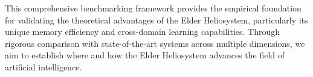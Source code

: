 This comprehensive benchmarking framework provides the empirical foundation for validating the theoretical advantages of the Elder Heliosystem, particularly its unique memory efficiency and cross-domain learning capabilities. Through rigorous comparison with state-of-the-art systems across multiple dimensions, we aim to establish where and how the Elder Heliosystem advances the field of artificial intelligence.